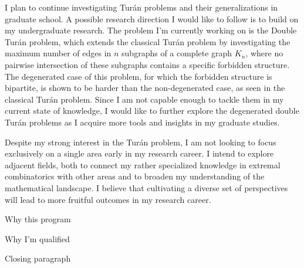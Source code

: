 \documentclass[12pt]{article}
\begin{document}
I plan to continue investigating Turán problems and their generalizations in graduate school. A
possible research direction I would like to follow is to build on my undergraduate research. The
problem I'm currently working on is the Double Turán problem, which extends the classical Turán
problem by investigating the maximum number of edges in $n$ subgraphs of a complete graph $K_n$,
where no pairwise intersection of these subgraphs contains a specific forbidden structure. The
degenerated case of this problem, for which the forbidden structure is bipartite, is shown to be
harder than the non-degenerated case, as seen in the classical Turán problem. Since I am not capable
enough to tackle them in my current state of knowledge, I would like to further explore the
degenerated double Turán problems as I acquire more tools and insights in my graduate studies.

Despite my strong interest in the Turán problem, I am not looking to focus exclusively on a single
area early in my research career. I intend to explore adjacent fields, both to connect my rather
specialized knowledge in extremal combinatorics with other areas and to broaden my understanding of
the mathematical landscape. I believe that cultivating a diverse set of perspectives will lead to
more fruitful outcomes in my research career. 

Why this program

Why I'm qualified

Closing paragraph
\end{document}

